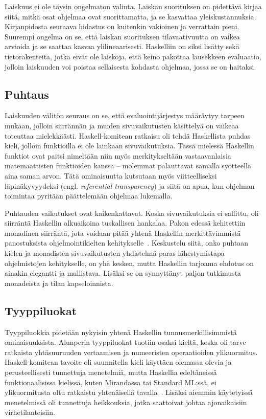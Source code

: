 \documentclass[finnish]{tktltiki2}
\begin{document}
Laiskuus ei ole täysin ongelmaton valinta. Laiskan suorituksen on pidettävä kirjaa siitä, mitkä osat
ohjelmaa ovat suorittamatta, ja se kasvattaa yleiskustannuksia. Kirjanpidosta seuraava hidastus on
kuitenkin vakioinen ja verrattain pieni. Suurempi ongelma on se, että laiskan suorituksen
tilavaativuutta on vaikea arvioida ja se saattaa kasvaa ylilineaarisesti. Haskelliin on siksi
lisätty sekä tietorakenteita, jotka eivät ole laiskoja, että keino pakottaa lausekkeen evaluaatio,
jolloin laiskuuden voi poistaa sellaisesta kohdasta ohjelmaa, jossa se on haitaksi.

\subsection{Puhtaus}

Laiskuuden välitön seuraus on se, että evaluointijärjestys määräytyy tarpeen mukaan, jolloin
siirrännän ja muiden sivuvaikutusten käsittelyä on vaikeaa toteuttaa mielekkäästi. Haskell-komitean
ratkaisu oli tehdä Haskellista puhdas kieli, jolloin funktioilla ei ole lainkaan sivuvaikutuksia.
Tässä mielessä Haskellin funktiot ovat paitsi nimeltään niin myös merkitykseltään vastaavanlaisia
matemaattisten funktioiden kanssa -- molemmat palauttavat samalla syötteellä aina saman arvon. Tätä
ominaisuutta kutsutaan myös viitteelliseksi läpinäkyvyydeksi (engl. \emph{referential transparency})
ja siitä on apua, kun ohjelman toimintaa pyritään päättelemään ohjelmaa lukemalla.

Puhtauden vaikutukset ovat kaikenkattavat. Koska sivuvaikutuksia ei sallittu, oli siirräntä
Haskellin alkuaikoina tuskallisen hankalaa. Pakon edessä kehitettiin monadinen siirräntä, jota
voidaan pitää yhtenä Haskellin merkittävimmistä panostuksista ohjelmointikielten
kehitykselle~\cite{hoh07}. Keskustelu siitä, onko puhtaan kielen ja monadisten sivuvaikutusten
yhdistelmä paras lähestymistapa ohjelmistojen kehitykselle, on yhä kesken, mutta Haskellin tarjoama
ehdotus on ainakin elegantti ja mullistava. Lisäksi se on synnyttänyt paljon tutkimusta monadeista
ja tilan kapseloinnista.

\subsection{Tyyppiluokat}

Tyyppiluokkia pidetään nykyisin yhtenä Haskellin tunnusmerkillisimmistä ominaisuuksista. Alunperin
tyyppiluokat tuotiin osaksi kieltä, koska oli tarve ratkaista yhtäsuuruuden vertaamisen ja
numeeristen operaatioiden ylikuormitus. Haskell-komitean tavoite oli suunnitella kieli käyttäen
olemassa olevia ja perusteellisesti tunnettuja menetelmiä, mutta Haskellia edeltäneissä
funktionaalisissa kielissä, kuten Mirandassa tai Standard ML:ssä, ei ylikuormitusta oltu ratkaistu
yhtenäisellä tavalla~\cite{tcih96}. Lisäksi aiemmin käytetyissä menetelmissä oli tunnettuja
heikkouksia, jotka saattoivat johtaa ajonaikaisiin virhetilanteisiin.
\end{document}

